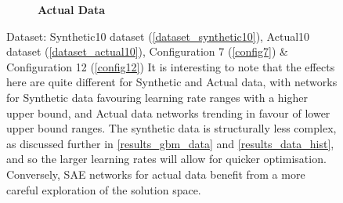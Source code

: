 \documentclass[a4paper,11pt,oneside]{article}
\theoremstyle{plain}
\theoremstyle{definition}
\begin{document}
\begin{figure}[H]
\begin{subfigure}{.5\textwidth}
		\caption{\textbf{Actual Data} 
			\newline }
		\label{figure-actual_mse_minmax_lr}
	\end{subfigure}
	\caption[SAE MSE by Learning Rates]{Dataset: Synthetic10 dataset (\ref{dataset_synthetic10}), Actual10 dataset (\ref{dataset_actual10}), Configuration 7 (\ref{config7}) \& Configuration 12 (\ref{config12})
		\newline It is interesting to  note that the effects here are quite different for Synthetic and Actual data, with networks for Synthetic data favouring learning rate ranges with a higher upper bound, and Actual data networks trending in favour of lower upper bound ranges. The synthetic data is structurally less complex, as discussed further in \ref{results_gbm_data} and \ref{results_data_hist}, and so the larger learning rates will allow for quicker optimisation. Conversely, SAE networks for actual data benefit from a more careful exploration of the solution space.}
	\label{figure-mse_lr}
\end{figure}
\end{document}
